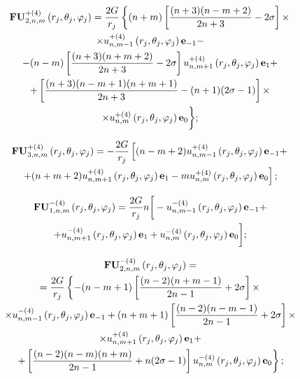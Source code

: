 \begin{multline}
{\bf{FU}}_{2,n,m}^{ + (4)}\left( {{r_j},{\theta _j},{\varphi _j}} \right) = \frac{{2G}}{{{r_j}}}\left\{ {(n + m)\left[ {\frac{{(n + 3)(n - m + 2)}}{{2n + 3}} - 2\sigma } \right] \times } \right.\\
\times u_{n,m - 1}^{ + (4)}\left( {{r_j},{\theta _j},{\varphi _j}} \right){{\bf{e}}_{ - 1}} - \\
- (n - m)\left[ {\frac{{(n + 3)(n + m + 2)}}{{2n + 3}} - 2\sigma } \right]u_{n,m + 1}^{ + (4)}\left( {{r_j},{\theta _j},{\varphi _j}} \right){{\bf{e}}_1} + \\
+ \left[ {\frac{{(n + 3)(n - m + 1)(n + m + 1)}}{{2n + 3}} - (n + 1)(2\sigma  - 1)} \right] \times \\
\times u_{n,m}^{ + (4)}\left( {{r_j},{\theta _j},{\varphi _j}} \right){{\bf{e}}_0} \bigg\};
\label{eq:8:f2}
\end{multline}

\begin{multline}
{\bf{FU}}_{3,n,m}^{ + (4)}\left( {{r_j},{\theta _j},{\varphi _j}} \right) =  - \frac{{2G}}{{{r_j}}}\left[ {(n - m + 2)u_{n,m - 1}^{ + (4)}\left( {{r_j},{\theta _j},{\varphi _j}} \right){{\bf{e}}_{ - 1}} + } \right.\\
\left. { + (n + m + 2)u_{n,m + 1}^{ + (4)}\left( {{r_j},{\theta _j},{\varphi _j}} \right){{\bf{e}}_1} - mu_{n,m}^{ + (4)}\left( {{r_j},{\theta _j},{\varphi _j}} \right){{\bf{e}}_0}} \right];
\label{eq:8:f3}
\end{multline}

\begin{multline}
{\bf{FU}}_{1,n,m}^{ - (4)}\left( {{r_j},{\theta _j},{\varphi _j}} \right) = \frac{{2G}}{{{r_j}}}n\bigg[ - u_{n,m - 1}^{ - (4)}\left( {{r_j},{\theta _j},{\varphi _j}} \right){{\bf{e}}_{ - 1}} + \\
+ u_{n,m + 1}^{ - (4)}\left( {{r_j},{\theta _j},{\varphi _j}} \right){{\bf{e}}_1} + u_{n,m}^{ - (4)}\left( {{r_j},{\theta _j},{\varphi _j}} \right){{\bf{e}}_0} \bigg];
\label{eq:8:f4}
\end{multline}

\begin{multline}
{\bf{FU}}_{2,n,m}^{ - (4)}\left( {{r_j},{\theta _j},{\varphi _j}} \right) = \\
= \frac{{2G}}{{{r_j}}}\left\{ { - (n - m + 1)\left[ {\frac{{(n - 2)(n + m - 1)}}{{2n - 1}} + 2\sigma } \right] \times } \right.\\
\times u_{n,m - 1}^{ - (4)}\left( {{r_j},{\theta _j},{\varphi _j}} \right){{\bf{e}}_{ - 1}} + (n + m + 1)\left[ {\frac{{(n - 2)(n - m - 1)}}{{2n - 1}} + 2\sigma } \right] \times \\
\times u_{n,m + 1}^{ + (4)}\left( {{r_j},{\theta _j},{\varphi _j}} \right){{\bf{e}}_1} + \\
\left. { + \left[ {\frac{{(n - 2)(n - m)(n + m)}}{{2n - 1}} + n(2\sigma  - 1)} \right]u_{n,m}^{ - (4)}\left( {{r_j},{\theta _j},{\varphi _j}} \right){{\bf{e}}_0}} \right\};
\label{eq:8:f5}
\end{multline}

